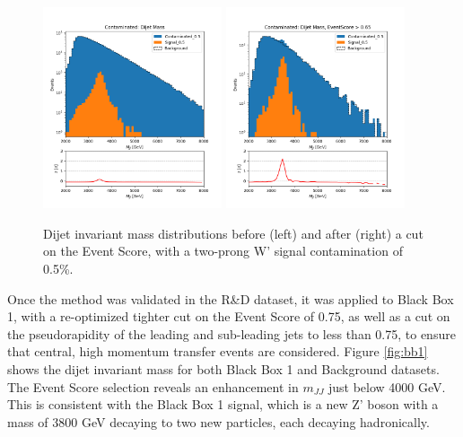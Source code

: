 \documentclass[letterpaper,11pt]{article}
\begin{document}
\begin{figure}[h!]
	\begin{center}
		\includegraphics[width=0.47\textwidth]{imgs/2Prong_Contaminated_0p5_JJ_Mass_Multi.png}
		\includegraphics[width=0.47\textwidth]{imgs/2Prong_Contaminated_0p5_JJ_Mass_EventScore0p65_Multi.png}
	\end{center}
	\caption{Dijet invariant mass distributions before (left) and after (right) a cut on the Event Score, with a two-prong W' signal contamination of 0.5\%.}
	\label{fig:m_JJ}
\end{figure}

Once the method was validated in the R\&D dataset, it was applied to Black Box 1, with a re-optimized tighter cut on the Event Score of 0.75, as well as a cut on the pseudorapidity of the leading and sub-leading jets to less than 0.75, to ensure that central, high momentum transfer events are considered. Figure {\ref{fig:bb1}} shows the dijet invariant mass for both Black Box 1 and Background datasets. The Event Score selection reveals an enhancement in $m_{JJ}$ just below 4000 GeV. This is consistent with the Black Box 1 signal, which is a new Z' boson with a mass of 3800 GeV decaying to two new particles, each decaying hadronically.
\end{document}
